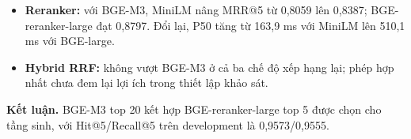 \begin{itemize}
\item \textbf{Reranker:} với BGE-M3, MiniLM nâng MRR@5 từ 0,8059 lên 0,8387; BGE-reranker-large đạt 0,8797. Đổi lại, P50 tăng từ 163,9 ms với MiniLM lên 510,1 ms với BGE-large.
\item \textbf{Hybrid RRF:} không vượt BGE-M3 ở cả ba chế độ xếp hạng lại; phép hợp nhất chưa đem lại lợi ích trong thiết lập khảo sát.
\end{itemize}

\noindent\textbf{Kết luận.} BGE-M3 top 20 kết hợp BGE-reranker-large top 5 được chọn cho tầng sinh, với Hit@5/Recall@5 trên development là 0,9573/0,9555.
